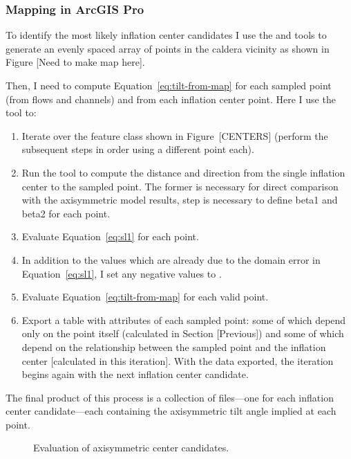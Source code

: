 
\subsubsection{Mapping in ArcGIS Pro}

To identify the most likely inflation center candidates I use the  and  tools to generate an evenly spaced array of points in the caldera vicinity as shown in Figure [Need to make map here].

Then, I need to compute Equation~\eqref{eq:tilt-from-map} for each sampled point (from flows and channels) and from each inflation center point. Here I use the  tool to:
\begin{enumerate}
    \item Iterate over the feature class shown in Figure~[CENTERS] (perform the subsequent steps in order using a different point each).
    \item Run the  tool to compute the distance and direction from the single inflation center to the sampled point. The former is necessary for direct comparison with the axisymmetric model results, step is necessary to define \acs{beta1} and \acs{beta2} for each point.
    \item Evaluate Equation~\eqref{eq:sl1} for each point.
    \item In addition to the values which are already  due to the domain error in Equation~\eqref{eq:sl1}, I set any negative values to .
    \item Evaluate Equation~\eqref{eq:tilt-from-map} for each valid point.
    \item Export a table with attributes of each sampled point: some of which depend only on the point itself (calculated in Section [Previous]) and some of which depend on the relationship between the sampled point and the inflation center [calculated in this iteration]. With the data exported, the iteration begins again with the next inflation center candidate.
\end{enumerate}
The final product of this process is a collection of  files---one for each inflation center candidate---each containing the axisymmetric tilt angle implied at each point. 

\begin{figure}
    \caption[]{Evaluation of axisymmetric center candidates.}%
    \label{fig:centers-eval-model}
\end{figure}




